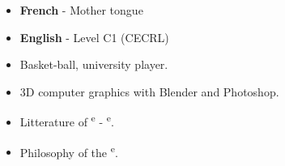 \documentclass[9pt]{developercv}
\begin{document}
\begin{center}

\begin{minipage}[t]{0.3\textwidth}
	\vspace{-\baselineskip}
	\begin{itemize}

	\item \textbf{French} - Mother tongue
	\item \textbf{English} - Level C1 (CECRL)
	\end{itemize}

\end{minipage}
\begin{minipage}[t]{0.3\textwidth}
	\vspace{-\baselineskip}
	
	\begin{itemize}
		\item[\faDribbble] Basket-ball, university player.
		\item[\faPaintBrush] 3D computer graphics with Blender and Photoshop.
		\item[\faBook] Litterature of \textsuperscript{e} - \textsuperscript{e}.
		\item[\faBook] Philosophy of the \textsuperscript{e}.
	\end{itemize}
\end{minipage}
\end{center}

\end{document}
